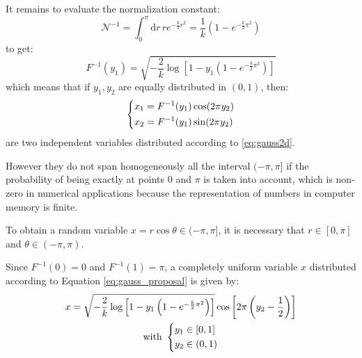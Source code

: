 It remains to evaluate the normalization constant:
\[
    \mathcal N^{-1} = \int_0^\pi\mathrm dr\,re^{-\frac{k}{2}r^2} = \frac{1}{k}\left(1-e^{-\frac{k}{2}\pi^2}\right)
\]
to get:
\[
    F^{-1}(y_1) = \sqrt{-\frac{2}{k}\log\left[1-y_1\left(1-e^{-\frac{k}{2}\pi^2}\right)\right]}
\]
which means that if $y_1, y_2$ are equally distributed in $(0,1)$, then:
\begin{equation*}
    \begin{dcases}
        x_1 = F^{-1}(y_1)\cos(2\pi y_2) \\
        x_2 = F^{-1}(y_1)\sin(2\pi y_2)
    \end{dcases}
\end{equation*}
are two independent variables distributed according to \eqref{eq:gauss2d}.

However they do not span homogeneously all the interval $(-\pi,\pi]$ if the probability of being exactly at points $0$ and $\pi$ is taken into account,
which is non-zero in numerical applications because the representation of numbers in computer memory is finite.

To obtain a random variable $x = r\cos \theta \in (-\pi,\pi]$,
it is necessary that $r \in [0,\pi]$ and $\theta \in (-\pi,\pi)$.

Since $F^{-1}(0)=0$ and $F^{-1}(1)=\pi$,
a completely uniform variable $x$ distributed according to Equation \eqref{eq:gauss_proposal} is given by:
\begin{equation}\label{eq:gauss_angle}\begin{gathered}
    x = \sqrt{-\frac{2}{k}\log\left[1-y_1\left(1-e^{-\frac{k}{2}\pi^2}\right)\right]}\cos\left[2\pi\left(y_2-\frac{1}{2}\right)\right] \\
    \mathrm{with}\ \begin{dcases}
                         y_1 \in [0,1] \\
                         y_2 \in (0,1)
                   \end{dcases}
\end{gathered}\end{equation}

